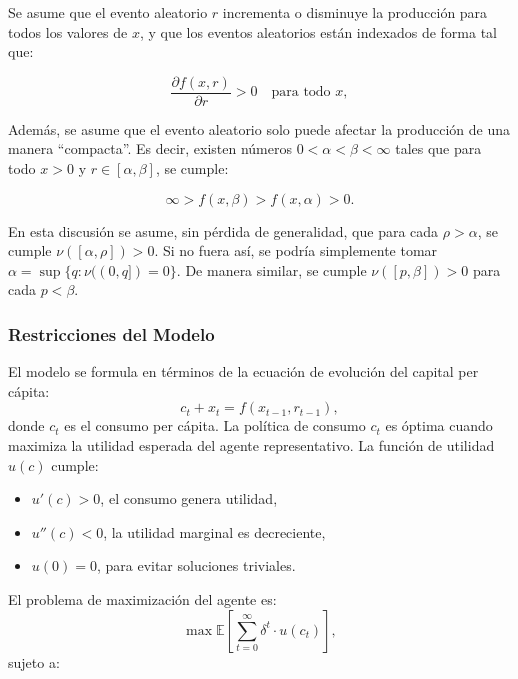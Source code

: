 \documentclass[a4paper,12pt]{article}
\begin{document}
Se asume que el evento aleatorio \( r \) incrementa o disminuye la producción para todos los valores de \( x \), y que los eventos aleatorios están indexados de forma tal que:

\begin{equation}
	\frac{\partial f(x, r)}{\partial r} > 0 \quad \text{para todo } x,
\end{equation}

Además, se asume que el evento aleatorio solo puede afectar la producción de una manera “compacta”. Es decir, existen números \( 0 < \alpha < \beta < \infty \) tales que para todo \( x > 0 \) y \( r \in [\alpha, \beta] \), se cumple:

		\begin{equation}
\infty > f(x, \beta) > f(x,\alpha) > 0. \tag{1.3}
		\end{equation}

En esta discusión se asume, sin pérdida de generalidad, que para cada \( \rho > \alpha \), se cumple \( \nu([\alpha, \rho]) > 0 \). Si no fuera así, se podría simplemente tomar \( \alpha = \sup \{ q : \nu((0, q]) = 0 \} \). De manera similar, se cumple \( \nu([p, \beta]) > 0 \) para cada \( p < \beta \).


\subsubsection{Restricciones del Modelo}

El modelo se formula en términos de la ecuación de evolución del capital per cápita:
\begin{equation}
c_t + x_t = f(x_{t-1}, r_{t-1}),
\end{equation}
donde $c_t$ es el consumo per cápita. La política de consumo $c_t$ es óptima cuando maximiza la utilidad esperada del agente representativo. La función de utilidad $u(c)$ cumple:
\begin{itemize}
	\item $u'(c) > 0$, el consumo genera utilidad,
	\item $u''(c) < 0$, la utilidad marginal es decreciente,
	\item $u(0) = 0$, para evitar soluciones triviales.
\end{itemize}

El problema de maximización del agente es:
\begin{equation}
\max \mathbb{E} \left[ \sum_{t=0}^{\infty} \delta^t \cdot u(c_t) \right],
\end{equation}
sujeto a:
\end{document}

